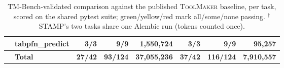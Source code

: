 \documentclass{article}
\newcommand{\G}[1]{\cellcolor{okgreen}#1}
\begin{document}
\begin{table}
\begin{tabular}{@{}ll rrr rrr@{}}
 & tabpfn\_predict & \G{3/3} & \G{9/9} & 1,550,724 & \G{3/3} & \G{9/9} & 95,257 \\
\midrule
 & \textbf{Total} & \textbf{27/42} & \textbf{93/124} & \textbf{37,055,236} & \textbf{37/42} & \textbf{116/124} & \textbf{7,910,557} \\
\bottomrule
\end{tabular}
\caption{TM-Bench-validated comparison against the published \textsc{ToolMaker} baseline, per task, scored on the shared pytest suite; green/yellow/red mark all/some/none passing. $^\dagger$STAMP's two tasks share one Alembic run (tokens counted once).}
\label{tab:alembic-tmbench-compare}
\end{table}
\end{document}
